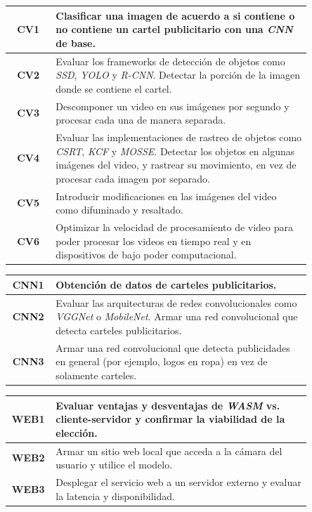 \documentclass[a4paper]{article}
\begin{document}
\begin{center}
\begin{tabular}{c m{0.85\linewidth}} \toprule
    \textbf{CV1} & Clasificar una imagen de acuerdo a si contiene o no contiene un cartel publicitario con una \textit{CNN} de base. \\ \midrule
    \textbf{CV2} & Evaluar los frameworks de detección de objetos como \textit{SSD}, \textit{YOLO} y \textit{R-CNN}. \newline Detectar la porción de la imagen donde se contiene el cartel. \\ \midrule
    \textbf{CV3} & Descomponer un video en sus imágenes por segundo y procesar cada una de manera separada. \\ \midrule
    \textbf{CV4} & Evaluar las implementaciones de rastreo de objetos como \textit{CSRT}, \textit{KCF} y \textit{MOSSE}. \newline Detectar los objetos en algunas imágenes del video, y rastrear su movimiento, en vez de procesar cada imagen por separado. \\ \midrule
    \textbf{CV5} & Introducir modificaciones en las imágenes del video como difuminado y resaltado. \\ \midrule
    \textbf{CV6} & Optimizar la velocidad de procesamiento de video para poder procesar los videos en tiempo real y en dispositivos de bajo poder computacional. \\ \bottomrule
\end{tabular}
\end{center}

\begin{center}
\begin{tabular}{c m{0.85\linewidth}} \toprule
    \textbf{CNN1} & Obtención de datos de carteles publicitarios. \\ \midrule
    \textbf{CNN2} & Evaluar las arquitecturas de redes convolucionales como \textit{VGGNet} o \textit{MobileNet}. \newline Armar una red convolucional que detecta carteles publicitarios. \\ \midrule
    \textbf{CNN3} & Armar una red convolucional que detecta publicidades en general (por ejemplo, logos en ropa) en vez de solamente carteles. \\ \bottomrule
\end{tabular}
\end{center}

\begin{center}
\begin{tabular}{c m{0.85\linewidth}} \toprule
    \textbf{WEB1} & Evaluar ventajas y desventajas de \textit{WASM} vs. cliente-servidor y confirmar la viabilidad de la elección. \\ \midrule
    \textbf{WEB2} & Armar un sitio web local que acceda a la cámara del usuario y utilice el modelo. \\ \midrule
    \textbf{WEB3} & Desplegar el servicio web a un servidor externo y evaluar la latencia y disponibilidad. \\ \bottomrule
\end{tabular}
\end{center}
\end{document}
